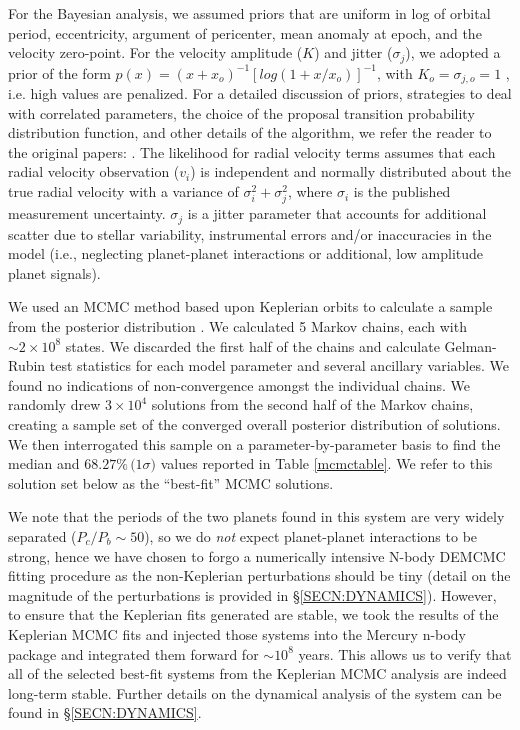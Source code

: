 For the Bayesian analysis, we assumed priors that are uniform in log
of orbital period, eccentricity, argument of pericenter, mean anomaly
at epoch, and the velocity zero-point.  For the velocity amplitude
($K$) and jitter ($\sigma_j$), we adopted a prior of the form
$p(x)=(x+x_o)^{-1}[log(1+x/x_o)]^{-1}$, with $K_o=\sigma_{j,o}=1$ \mps,
i.e. high values are penalized. For a detailed discussion of priors,
strategies to deal with correlated parameters, the choice of the
proposal transition probability distribution function, and other
details of the algorithm, we refer the reader to the original papers:
\cite{Ford2005,Ford2006,2007ASPC..371..189F}. The likelihood for
radial velocity terms assumes that each radial velocity observation
($v_i$) is independent and normally distributed about the true radial
velocity with a variance of $\sigma_i^2+\sigma_j^2$, where $\sigma_i$
is the published measurement uncertainty.  $\sigma_j$ is a jitter
parameter that accounts for additional scatter due to stellar
variability, instrumental errors and/or inaccuracies in the model
(i.e., neglecting planet-planet interactions or additional, low
amplitude planet signals).

We used an MCMC method based upon Keplerian orbits to calculate a
sample from the posterior distribution \citep{Ford2006}. We calculated
5 Markov chains, each with $\sim 2 \times 10^8$ states. We
discarded the first half of the chains and calculate Gelman-Rubin test
statistics for each model parameter and several ancillary
variables. We found no indications of non-convergence amongst the
individual chains. We randomly drew $3\times 10^4$ solutions from the
second half of the Markov chains, creating a sample set of the
converged overall posterior distribution of solutions. We then
interrogated this sample on a parameter-by-parameter basis to find the
median and $68.27\%\,(1$$\sigma)$ values reported in Table
\ref{mcmctable}. We refer to this solution set below as the
``best-fit'' MCMC solutions.

We note that the periods of the two planets found in this system are
very widely separated ($P_c/P_b \sim 50$), so we do \emph{not} expect
planet-planet interactions to be strong, hence we have chosen to forgo
a numerically intensive N-body DEMCMC fitting procedure \citep[see
  e.g.][]{Johnson2011,2011ApJ...729...98P} as the non-Keplerian
perturbations should be tiny (detail on the magnitude of the
perturbations is provided in \S \ref{SECN:DYNAMICS}).  However, to
ensure that the Keplerian fits generated are stable, we took the
results of the Keplerian MCMC fits and injected those systems into the
Mercury n-body package \citep{Chambers1999} and integrated them
forward for $\sim 10^8$ years. This allows us to verify that all of the
selected best-fit systems from the Keplerian MCMC analysis are indeed
long-term stable. Further details on the dynamical analysis of the
system can be found in \S \ref{SECN:DYNAMICS}.

